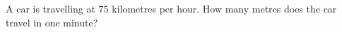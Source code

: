 A car is travelling at $75$ kilometres per hour. How many metres does the car travel in one minute?
